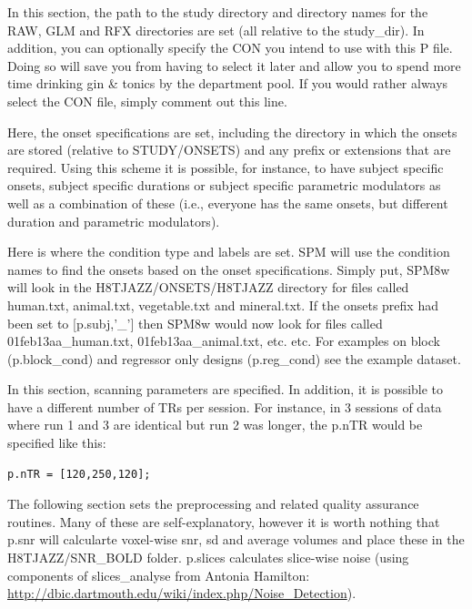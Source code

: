 \documentclass[12pt]{article}
\begin{document}
In this section, the path to the study directory and directory names for the RAW, GLM and RFX directories are set (all relative to the study\_dir). In addition, you can optionally specify the CON you intend to use with this P file. Doing so will save you from having to select it later and allow you to spend more time drinking gin \& tonics by the department pool. If you would rather always select the CON file, simply comment out this line. 


Here, the onset specifications are set, including the directory in which the onsets are stored (relative to STUDY/ONSETS) and any prefix or extensions that are required. Using this scheme it is possible, for instance, to have subject specific onsets, subject specific durations or subject specific parametric modulators as well as a combination of these (i.e., everyone has the same onsets, but different duration and parametric modulators).
 

Here is where the condition type and labels are set. SPM will use the condition names to find the onsets based on the onset specifications. Simply put, SPM8w will look in the H8TJAZZ/ON\-SETS/H8TJAZZ directory for files called human.txt, animal.txt, vegetable.txt and mineral.txt. If the onsets prefix had been set to [p.subj,'\_'] then SPM8w would now look for files called 01feb13aa\_human.txt, 01feb13aa\_animal.txt, etc. etc. For examples on block (p.block\_cond) and regressor only designs (p.reg\_cond) see the example dataset. 


In this section, scanning parameters are specified. In addition, it is possible to have a different number of TRs per session. For instance, in 3 sessions of data where run 1 and 3 are identical but run 2 was longer, the p.nTR would be specified like this:
\begin{lstlisting}
p.nTR = [120,250,120];
\end{lstlisting}


The following section sets the preprocessing and related quality assurance routines. Many of these are self-explanatory, however it is worth nothing that p.snr will calcularte voxel-wise snr, sd and average volumes and place these in the H8TJAZZ/SNR\_BOLD folder. p.slices calculates slice-wise noise (using components of slices\_analyse from Antonia Hamilton: \url{http://dbic.dartmouth.edu/wiki/index.php/Noise_Detection}).
\end{document}
